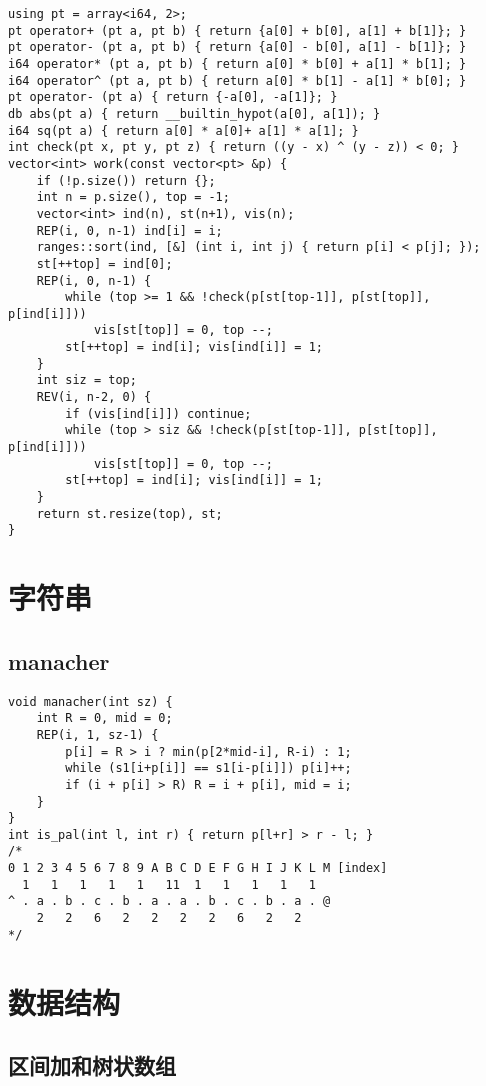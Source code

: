 \documentclass[a4paper,landscape,twocolumn]{ctexart}
\begin{document}
\begin{lstlisting}
using pt = array<i64, 2>;
pt operator+ (pt a, pt b) { return {a[0] + b[0], a[1] + b[1]}; }
pt operator- (pt a, pt b) { return {a[0] - b[0], a[1] - b[1]}; }
i64 operator* (pt a, pt b) { return a[0] * b[0] + a[1] * b[1]; }
i64 operator^ (pt a, pt b) { return a[0] * b[1] - a[1] * b[0]; }
pt operator- (pt a) { return {-a[0], -a[1]}; }
db abs(pt a) { return __builtin_hypot(a[0], a[1]); }
i64 sq(pt a) { return a[0] * a[0]+ a[1] * a[1]; }
int check(pt x, pt y, pt z) { return ((y - x) ^ (y - z)) < 0; }
vector<int> work(const vector<pt> &p) {
	if (!p.size()) return {};
	int n = p.size(), top = -1;
	vector<int> ind(n), st(n+1), vis(n);
	REP(i, 0, n-1) ind[i] = i;
	ranges::sort(ind, [&] (int i, int j) { return p[i] < p[j]; });
	st[++top] = ind[0];
	REP(i, 0, n-1) {
		while (top >= 1 && !check(p[st[top-1]], p[st[top]], p[ind[i]]))
			vis[st[top]] = 0, top --;
		st[++top] = ind[i]; vis[ind[i]] = 1;
	}
	int siz = top;
	REV(i, n-2, 0) {
		if (vis[ind[i]]) continue;
		while (top > siz && !check(p[st[top-1]], p[st[top]], p[ind[i]]))
			vis[st[top]] = 0, top --;
		st[++top] = ind[i]; vis[ind[i]] = 1;
	}
	return st.resize(top), st;
}
\end{lstlisting}

\section{字符串}

\subsection{manacher}

\begin{lstlisting}
void manacher(int sz) {
	int R = 0, mid = 0;
	REP(i, 1, sz-1) {
		p[i] = R > i ? min(p[2*mid-i], R-i) : 1;
		while (s1[i+p[i]] == s1[i-p[i]]) p[i]++;
		if (i + p[i] > R) R = i + p[i], mid = i;
	}
}
int is_pal(int l, int r) { return p[l+r] > r - l; }
/*
0 1 2 3 4 5 6 7 8 9 A B C D E F G H I J K L M [index]
  1   1   1   1   1   11  1   1   1   1   1
^ . a . b . c . b . a . a . b . c . b . a . @
    2   2   6   2   2   2   2   6   2   2
*/
\end{lstlisting}

\section{数据结构}

\subsection{区间加和树状数组}
\end{document}
